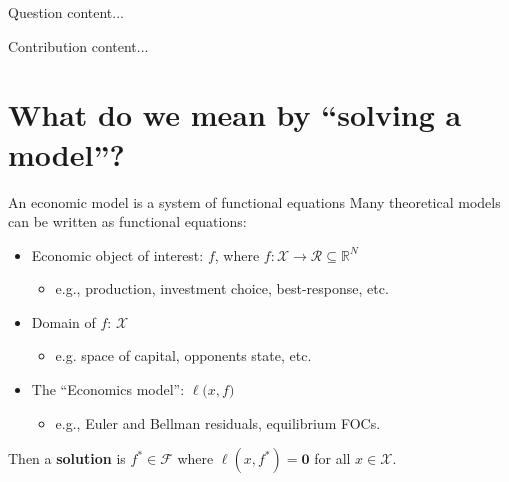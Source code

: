 \documentclass[aspectratio=169,10pt]{beamer}
\newcommand{\emphcolor}[1]{\textbf{\textcolor{emphcolorval}{#1}}}
\newcommand{\Xdom}{\mathcal{X}}
\newcommand{\F}{\mathcal{F}}
\begin{document}
\begin{frame}{Question}
	content...
\end{frame}

\begin{frame}{Contribution}
	content...
\end{frame}

\section{\textcolor{KahouBlack}{What do we mean by ``solving a model''?}}


\begin{frame}{An economic model is a system of functional equations}
	Many theoretical models can be written as functional equations:
	\begin{itemize}
		\item Economic object of interest: $f $, where $f : \Xdom\to \mathcal{R}\subseteq \mathbb{R}^N$ 
		\begin{itemize}
			\item e.g., production, investment choice, best-response, etc.
		\end{itemize}
		\vspace{0.1in}
		\item Domain of $f$: $\Xdom$  
		\begin{itemize}
			\item e.g. space of capital, opponents state, etc.
		\end{itemize}
		\vspace{0.1in}
		\item The ``Economics model'':  $\ell \big(x,f\big)$  
		\begin{itemize}
			\item e.g., Euler and Bellman residuals, equilibrium FOCs.
		\end{itemize}
		\vspace{0.1in}
	\end{itemize}
	Then a \emphcolor{solution} is $f^*\in \F$ where $\ell(x,f^*) = \mathbf{0}$ for all $x \in \Xdom$.\vspace{0.1in}
\end{frame}
\end{document}
